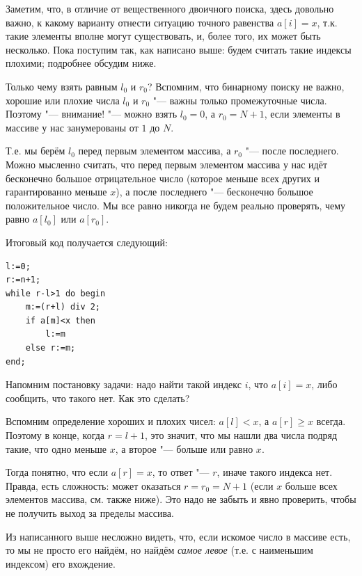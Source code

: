\documentclass[a4paper,10pt]{problems}
\begin{document}
Заметим, что, в отличие от вещественного двоичного поиска, здесь довольно важно, к какому варианту 
отнести ситуацию точного равенства $a[i]=x$, т.к. такие элементы вполне могут существовать,
и, более того, их может быть несколько.
Пока поступим так, как написано выше: будем считать такие индексы плохими;
подробнее обсудим ниже.

Только чему взять равным $l_0$ и $r_0$?
Вспомним, что бинарному поиску не важно, хорошие или плохие числа $l_0$ и $r_0$ "---
важны только промежуточные числа. 
Поэтому "--- внимание! "--- можно взять $l_0=0$, а $r_0=N+1$, если элементы в массиве
у нас занумерованы от $1$ до $N$. 

Т.е. мы берём $l_0$ перед первым элементом массива, а $r_0$ "--- после последнего.
Можно мысленно считать, что перед первым элементом массива у нас идёт бесконечно большое отрицательное число
(которое меньше всех других и гарантированно меньше $x$), а после последнего "---
бесконечно большое положительное число.
Мы все равно никогда не будем реально проверять, чему равно $a[l_0]$ или $a[r_0]$.

Итоговый код получается следующий:
\begin{codesampleo}\begin{verbatim}
l:=0;
r:=n+1;  
while r-l>1 do begin    
    m:=(r+l) div 2;
    if a[m]<x then
        l:=m
    else r:=m;
end;
\end{verbatim}
\end{codesampleo}

Напомним постановку задачи: надо найти такой индекс $i$, что $a[i]=x$, либо сообщить,
что такого нет. Как это сделать?

Вспомним определение хороших и плохих чисел: $a[l]<x$, а $a[r]\geq x$ всегда.
Поэтому в конце, когда $r=l+1$, это значит, что мы нашли два числа подряд такие,
что одно меньше $x$, а второе "--- больше или равно $x$.

Тогда понятно, что если $a[r]=x$, то ответ "--- $r$, иначе такого индекса нет.
Правда, есть сложность: может оказаться $r=r_0=N+1$ (если $x$ больше всех элементов массива, см. также ниже). 
Это надо не забыть и явно проверить, чтобы не получить выход за пределы массива.

Из написанного выше несложно видеть, что, если искомое число в массиве есть, то мы не просто его найдём,
но найдём \textit{самое левое} (т.е. с наименьшим индексом) его вхождение.
\end{document}
